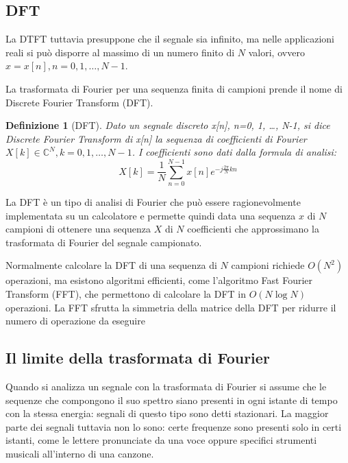 \documentclass[12pt, a4paper]{article}
\newtheorem*{definition}{Definizione}
\begin{document}
\subsection{DFT}
La DTFT tuttavia presuppone che il segnale sia infinito, ma nelle applicazioni reali si può disporre al massimo di un numero finito di $N$ valori, ovvero $x=x[n], n=0, 1, \dots, N-1$.
\vspace{0.5em}

La trasformata di Fourier per una sequenza finita di campioni prende il nome di Discrete Fourier Transform (DFT).

\begin{definition}[DFT]

  Dato un segnale discreto x[n], n=0, 1, \dots, N-1, si dice Discrete Fourier Transform di x[n] la sequenza di coefficienti di Fourier $X[k] \in \mathbb{C}^N, k=0, 1, \dots, N-1$. I coefficienti sono dati dalla formula di analisi:
  \[
    X[k] = \frac{1}{N}\sum_{n=0}^{N-1} x[n] e^{-j  \frac{2\pi}{N}kn}
  \]
\end{definition}

La DFT è un tipo di analisi di Fourier che può essere ragionevolmente implementata su un calcolatore e permette quindi data una sequenza $x$ di $N$ campioni di ottenere una sequenza $X$ di $N$ coefficienti che approssimano la trasformata di Fourier del segnale campionato.

\vspace{0.5em}
Normalmente calcolare la DFT di una sequenza di $N$ campioni richiede $O(N^2)$ operazioni, ma esistono algoritmi efficienti, come l'algoritmo Fast Fourier Transform (FFT), che permettono di calcolare la DFT in $O(N \log N)$ operazioni. La FFT sfrutta la simmetria della matrice della DFT per ridurre il numero di operazione da eseguire

\subsection{Il limite della trasformata di Fourier}
Quando si analizza un segnale con la trasformata di Fourier si assume che le sequenze che compongono il suo spettro siano presenti in ogni istante di tempo con la stessa energia: segnali di questo tipo sono detti stazionari. La maggior parte dei segnali tuttavia non lo sono: certe frequenze sono presenti solo in certi istanti, come le lettere pronunciate da una voce oppure specifici strumenti musicali all'interno di una canzone.
\vspace{0.5em}
\end{document}
